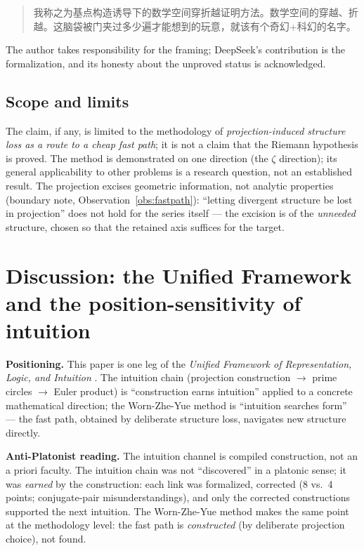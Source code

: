 \documentclass[11pt]{article}
\theoremstyle{remark}
\begin{document}
\begin{quote}
我称之为基点构造诱导下的数学空间穿折越证明方法。数学空间的穿越、折越。这脑袋被门夹过多少遍才能想到的玩意，就该有个奇幻+科幻的名字。
\end{quote}

The author takes responsibility for the framing; DeepSeek's contribution is
the formalization, and its honesty about the unproved status is acknowledged.

\subsection{Scope and limits}

The claim, if any, is limited to the methodology of \emph{projection-induced
structure loss as a route to a cheap fast path}; it is not a claim that the
Riemann hypothesis is proved. The method is demonstrated on one direction
(the $\zeta$ direction); its general applicability to other problems is a
research question, not an established result. The projection excises
geometric information, not analytic properties (boundary note,
Observation~\ref{obs:fastpath}): ``letting divergent structure be lost in
projection'' does not hold for the series itself --- the excision is of the
\emph{unneeded} structure, chosen so that the retained axis suffices for the
target.

\section{Discussion: the Unified Framework and the position-sensitivity of intuition}
\label{sec:discussion}

\textbf{Positioning.} This paper is one leg of the \emph{Unified Framework of
Representation, Logic, and Intuition} \cite{uf-manifesto}. The intuition chain
(projection construction $\rightarrow$ prime circles $\rightarrow$ Euler
product) is ``construction earns intuition'' applied to a concrete
mathematical direction; the Worn-Zhe-Yue method is ``intuition searches
form'' --- the fast path, obtained by deliberate structure loss, navigates
new structure directly.

\textbf{Anti-Platonist reading.} The intuition channel is compiled
construction, not an a priori faculty. The intuition chain was not
``discovered'' in a platonic sense; it was \emph{earned} by the construction:
each link was formalized, corrected (8 vs.\ 4 points; conjugate-pair
misunderstandings), and only the corrected constructions supported the next
intuition. The Worn-Zhe-Yue method makes the same point at the methodology
level: the fast path is \emph{constructed} (by deliberate projection choice),
not found.
\end{document}
